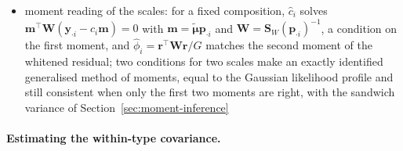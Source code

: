 \documentclass[pdflatex, sn-nature]{sn-jnl}
\theoremstyle{thmstyleone}%
\theoremstyle{thmstyletwo}%
\theoremstyle{thmstylethree}%
\begin{document}
\begin{itemize}
        here \(n_{i}\) is one only when \(a_{i}\) is known (same platform, or paired samples)
  \item moment reading of the scales: for a fixed composition, \(\hat c_{i}\) solves
        \(\boldsymbol{m}^{\top}\boldsymbol{W}(\boldsymbol{y}_{\cdot i}-c_{i}\boldsymbol{m})=0\) with \(\boldsymbol{m}=\tilde{\boldsymbol{\mu}}\boldsymbol{p}_{\cdot i}\) and
        \(\boldsymbol{W}=\boldsymbol{S}_{W}(\boldsymbol{p}_{\cdot i})^{-1}\), a condition on the first moment, and \(\hat\phi_{i}=\boldsymbol{r}^{\top}\boldsymbol{W}\boldsymbol{r}/G\)
        matches the second moment of the whitened residual; two conditions for two scales make an exactly identified
        generalised method of moments, equal to the Gaussian likelihood profile and still consistent when only the first
        two moments are right, with the sandwich variance of Section~\ref{sec:moment-inference}
\end{itemize}

\paragraph{Estimating the within-type covariance.}
\label{sec:cov-estimation}
\end{document}
